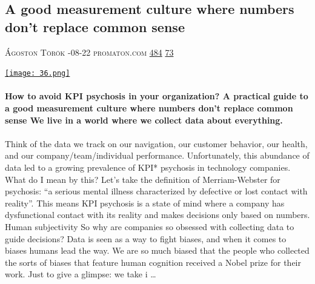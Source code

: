 \documentclass[10pt,a4paper]{article}
\begin{document}
\begin{multicols}{2}
\begin{minipage}{\linewidth}
\subsection{A good measurement culture where numbers don’t replace common sense}
\textsc{\footnotesize
{\scriptsize\faUser}\space 
Ágoston Török 
{\scriptsize\faCalendar}-08-22 
{\scriptsize\faGlobe}\space 
promaton.com 
{\scriptsize\faThumbsOUp}\space 
\href{http://news.ycombinator.com/item?id=37220667\&utm\_term=comment}{484} 
{\scriptsize\faComments}\space 
\href{http://news.ycombinator.com/item?id=37220667\&utm\_term=comment}{73} 
}
\par\medskip\noindent
\href{https://blog.promaton.com/how-to-avoid-kpi-psychosis-in-your-organization-5ffc83967f2b?utm\_source=hackernewsletter\&utm\_medium=email\&utm\_term=working}{
    \texttt{[image: 36.png]}
}
\end{minipage}
\paragraph{}
\textbf{How to avoid KPI psychosis in your organization?
A practical guide to a good measurement culture where numbers don’t replace common sense
We live in a world where we collect data about everything.}
\paragraph{}
 Think of the data we track on our navigation, our customer behavior, our health, and our company/team/individual performance. Unfortunately, this abundance of data led to a growing prevalence of KPI* psychosis in technology companies.
What do I mean by this? Let’s take the definition of Merriam-Webster for psychosis: “a serious mental illness characterized by defective or lost contact with reality”. This means KPI psychosis is a state of mind where a company has dysfunctional contact with its reality and makes decisions only based on numbers.
Human subjectivity
So why are companies so obsessed with collecting data to guide decisions? Data is seen as a way to fight biases, and when it comes to biases humans lead the way. We are so much biased that the people who collected the sorts of biases that feature human cognition received a Nobel prize for their work.
Just to give a glimpse: we take i
\dots\par
\noindent\begin{minipage}{\linewidth}
\medskip

\end{minipage}
\end{multicols}
\end{document}
